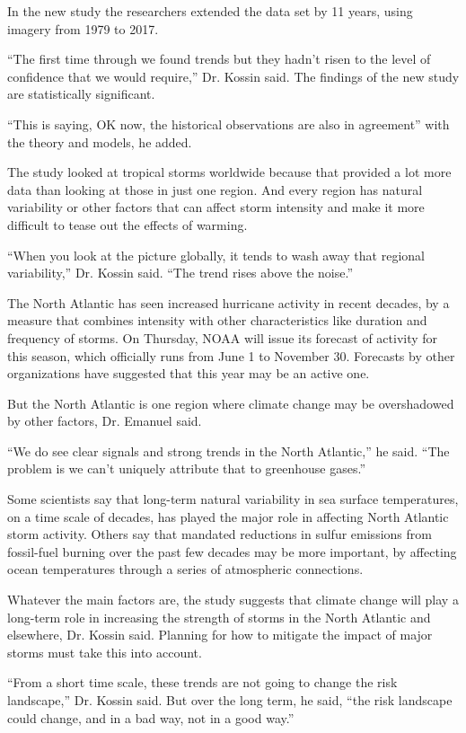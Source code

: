 In the new study the researchers extended the data set by 11 years,
using imagery from 1979 to 2017.

``The first time through we found trends but they hadn't risen to the
level of confidence that we would require,'' Dr. Kossin said. The
findings of the new study are statistically significant.

``This is saying, OK now, the historical observations are also in
agreement'' with the theory and models, he added.

The study looked at tropical storms worldwide because that provided a
lot more data than looking at those in just one region. And every region
has natural variability or other factors that can affect storm intensity
and make it more difficult to tease out the effects of warming.

``When you look at the picture globally, it tends to wash away that
regional variability,'' Dr. Kossin said. ``The trend rises above the
noise.''

The North Atlantic has seen increased hurricane activity in recent
decades, by a measure that combines intensity with other characteristics
like duration and frequency of storms. On Thursday, NOAA will issue its
forecast of activity for this season, which officially runs from June 1
to November 30. Forecasts by other organizations have suggested that
this year may be an active one.

But the North Atlantic is one region where climate change may be
overshadowed by other factors, Dr. Emanuel said.

``We do see clear signals and strong trends in the North Atlantic,'' he
said. ``The problem is we can't uniquely attribute that to greenhouse
gases.''

Some scientists say that long-term natural variability in sea surface
temperatures, on a time scale of decades, has played the major role in
affecting North Atlantic storm activity. Others say that mandated
reductions in sulfur emissions from fossil-fuel burning over the past
few decades may be more important, by affecting ocean temperatures
through a series of atmospheric connections.

Whatever the main factors are, the study suggests that climate change
will play a long-term role in increasing the strength of storms in the
North Atlantic and elsewhere, Dr. Kossin said. Planning for how to
mitigate the impact of major storms must take this into account.

``From a short time scale, these trends are not going to change the risk
landscape,'' Dr. Kossin said. But over the long term, he said, ``the
risk landscape could change, and in a bad way, not in a good way.''

